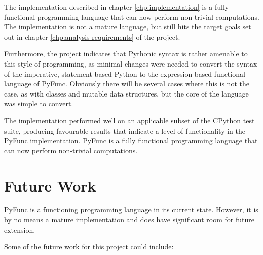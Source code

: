 \documentclass{l4proj}
\begin{document}
The implementation described in chapter \ref{chp:implementation} is a fully functional programming language that can now perform non-trivial computations.
The implementation is not a mature language, but still hits the target goals set out in chapter \ref{chp:analysis-requirements} of the project.

Furthermore, the project indicates that Pythonic syntax is rather amenable to this style of programming, as minimal changes were needed to convert the syntax of the imperative, statement-based Python to the expression-based functional language of PyFunc.
Obviously there will be several cases where this is not the case, as with classes and mutable data structures, but the core of the language was simple to convert.

The implementation performed well on an applicable subset of the CPython test suite, producing favourable results that indicate a level of functionality in the PyFunc implementation.
PyFunc is a fully functional programming language that can now perform non-trivial computations.

\section{Future Work}

PyFunc is a functioning programming language in its current state.
However, it is by no means a mature implementation and does have significant room for future extension.

Some of the future work for this project could include:
\end{document}
